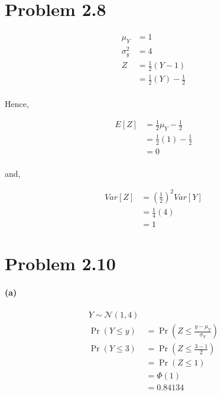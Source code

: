 \documentclass[10pt,letter]{article}
\begin{document}
\section*{Problem 2.8}
\begin{align*}
\mu_Y &= 1\\
\sigma_{y}^{2} &= 4\\
Z &= \frac{1}{2}(Y-1)\\
&= \frac{1}{2}(Y) - \frac{1}{2}\\
\end{align*}
\begin{center}
Hence, 
\end{center}
\begin{align*}
E[Z] &= \frac{1}{2}\mu_Y - \frac{1}{2}\\
&= \frac{1}{2}(1) - \frac{1}{2}\\
&=0\\
\end{align*}
\begin{center}
and, 
\end{center}
\begin{align*}
Var[Z]&=\left(\frac{1}{2}\right)^{2}Var[Y]\\
&=\frac{1}{4}(4)\\
&=1
\end{align*}




\section*{Problem 2.10}

\paragraph{(a)}
\begin{align*}
Y\sim \mathcal{N}(1,4)\\
\Pr(Y\leq y) &= \Pr\left(Z\leq \frac{y-\mu_Y}{\sigma_{Y}} \right)\\
\Pr(Y\leq 3) &= \Pr\left(Z\leq \frac{3-1}{2} \right)\\
&= \Pr\left(Z\leq 1 \right)\\
&=\Phi(1)\\
&= 0.84134\\
\end{align*}
\end{document}

